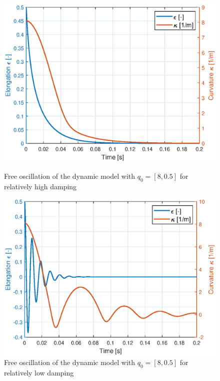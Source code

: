 \begin{figure}[H]
\begin{minipage}{0.48\textwidth}
    \centering
    \includegraphics[width = \textwidth]{Figures/Chapter4/freeoschighd.eps}
    \caption{Free oscillation of the dynamic model with $q_0 = [8,0.5]$ for relatively high damping}
    \label{figapp4:highd}
    \end{minipage}
\begin{minipage}{0.48\textwidth}
    \centering
    \includegraphics[width = \textwidth]{Figures/Chapter4/freeosclowd.eps}
    \caption{Free oscillation of the dynamic model with $q_0 = [8,0.5]$ for relatively low damping}
    \label{figapp4:lowd}
    \end{minipage}
\end{figure}